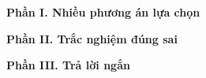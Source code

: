 \documentclass[11pt]{book}
\begin{document}
	\lamtieudetracnghiem
	\soanthao
	\indebai
	\indebailoigiai
	
	
	\lamtieude
	
	
	\noindent\textbf{Phần I. Nhiều phương án lựa chọn}
	\setcounter{question}{0}
	
	\noindent\textbf{Phần II. Trắc nghiệm đúng sai}
	\setcounter{question}{0}
	
	\noindent\textbf{Phần III. Trả lời ngắn}
	\setcounter{question}{0}
	
	\label{dbPage}
	
\end{document}
